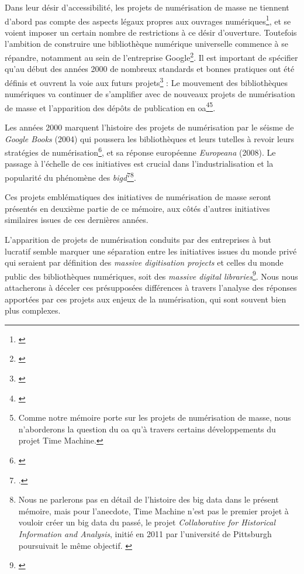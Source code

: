 Dans leur désir d'accessibilité, les projets de numérisation de masse ne tiennent d'abord pas compte des aspects légaux propres aux ouvrages numériques\footnote{\cite[p.251]{jones_public_2017}}, et se voient imposer un certain nombre de restrictions à ce désir d'ouverture. Toutefois l'ambition de construire une bibliothèque numérique universelle commence à se répandre, notamment au sein de l'entreprise Google\footnote{\cite{cook_googles_nodate}}. Il est important de spécifier qu'au début des années 2000 de nombreux standards et  bonnes pratiques ont été définis et ouvrent la voie aux futurs projets\footnote{\cite{dunning_digitising_2009}} :  Le mouvement des bibliothèques numériques va continuer de s'amplifier avec de nouveaux projets de numérisation de masse et l'apparition des dépôts de publication en \gls{oa}\footnote{\cite{xie_discover_2016}}\footnote{Comme notre mémoire porte sur les projets de numérisation de masse, nous n'aborderons la question du \gls{oa} qu'à travers certains développements du projet Time Machine.}. 

Les années 2000 marquent l'histoire des projets de numérisation par le séisme de \textit{Google Books} (2004) qui poussera les bibliothèques et leurs tutelles à revoir leurs stratégies de numérisation\footnote{\cite{dufrene_numerisation_2013}}, et sa réponse européenne \textit{Europeana} (2008). Le passage à l'échelle de ces initiatives est crucial dans l'industrialisation et la popularité du phénomène des \textit{\gls{bigd}}\footcite{thylstrup_politics_2018}\footnote{Nous ne parlerons pas en détail de l'histoire des big data dans le présent mémoire, mais pour l'anecdote, Time Machine n'est pas le premier projet à vouloir créer un big data du passé, le projet \textit{Collaborative for Historical Information and Analysis}, initié en 2011 par l'université de Pittsburgh poursuivait le même objectif. \cite{manning_big_2013}}.

Ces projets emblématiques des initiatives de numérisation de masse seront présentés en deuxième partie de ce mémoire, aux côtés d'autres initiatives similaires issues de ces dernières années.

L'apparition de projets de numérisation conduits par des entreprises à but lucratif semble marquer une séparation entre les initiatives issues du monde privé qui seraient par définition des \textit{massive digitisation projects} et celles du monde public des bibliothèques numériques, soit des \textit{massive digital libraries}\footnote{\cite[p.245]{jones_public_2017}}. Nous nous attacherons à déceler ces présupposées différences à travers l'analyse des réponses apportées par ces projets aux enjeux de la numérisation, qui sont souvent bien plus complexes.

